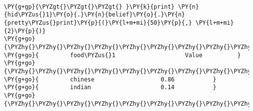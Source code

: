 \begin{example}
\caption{Vypočtené hodnoty skrytých proměnných}
\label{lst:epres}
\begin{Verbatim}[commandchars=\\\{\}]

\PY{g+gp}{\PYZgt{}\PYZgt{}\PYZgt{} }\PY{k}{print} \PY{n}{hid\PYZus{}1}\PY{o}{.}\PY{n}{belief}\PY{o}{.}\PY{n}{pretty\PYZus{}print}\PY{p}{(}\PY{l+m+mi}{50}\PY{p}{,} \PY{l+m+mi}{2}\PY{p}{)}
\PY{g+go}{\PYZhy{}\PYZhy{}\PYZhy{}\PYZhy{}\PYZhy{}\PYZhy{}\PYZhy{}\PYZhy{}\PYZhy{}\PYZhy{}\PYZhy{}\PYZhy{}\PYZhy{}\PYZhy{}\PYZhy{}\PYZhy{}\PYZhy{}\PYZhy{}\PYZhy{}\PYZhy{}\PYZhy{}\PYZhy{}\PYZhy{}\PYZhy{}\PYZhy{}\PYZhy{}\PYZhy{}\PYZhy{}\PYZhy{}\PYZhy{}\PYZhy{}\PYZhy{}\PYZhy{}\PYZhy{}\PYZhy{}\PYZhy{}\PYZhy{}\PYZhy{}\PYZhy{}\PYZhy{}\PYZhy{}\PYZhy{}\PYZhy{}\PYZhy{}\PYZhy{}\PYZhy{}\PYZhy{}\PYZhy{}\PYZhy{}\PYZhy{}}
\PY{g+go}{         food\PYZus{}1                    Value          }
\PY{g+go}{\PYZhy{}\PYZhy{}\PYZhy{}\PYZhy{}\PYZhy{}\PYZhy{}\PYZhy{}\PYZhy{}\PYZhy{}\PYZhy{}\PYZhy{}\PYZhy{}\PYZhy{}\PYZhy{}\PYZhy{}\PYZhy{}\PYZhy{}\PYZhy{}\PYZhy{}\PYZhy{}\PYZhy{}\PYZhy{}\PYZhy{}\PYZhy{}\PYZhy{}\PYZhy{}\PYZhy{}\PYZhy{}\PYZhy{}\PYZhy{}\PYZhy{}\PYZhy{}\PYZhy{}\PYZhy{}\PYZhy{}\PYZhy{}\PYZhy{}\PYZhy{}\PYZhy{}\PYZhy{}\PYZhy{}\PYZhy{}\PYZhy{}\PYZhy{}\PYZhy{}\PYZhy{}\PYZhy{}\PYZhy{}\PYZhy{}\PYZhy{}}
\PY{g+go}{         chinese                   0.86           }
\PY{g+go}{         indian                    0.14           }
\PY{g+go}{\PYZhy{}\PYZhy{}\PYZhy{}\PYZhy{}\PYZhy{}\PYZhy{}\PYZhy{}\PYZhy{}\PYZhy{}\PYZhy{}\PYZhy{}\PYZhy{}\PYZhy{}\PYZhy{}\PYZhy{}\PYZhy{}\PYZhy{}\PYZhy{}\PYZhy{}\PYZhy{}\PYZhy{}\PYZhy{}\PYZhy{}\PYZhy{}\PYZhy{}\PYZhy{}\PYZhy{}\PYZhy{}\PYZhy{}\PYZhy{}\PYZhy{}\PYZhy{}\PYZhy{}\PYZhy{}\PYZhy{}\PYZhy{}\PYZhy{}\PYZhy{}\PYZhy{}\PYZhy{}\PYZhy{}\PYZhy{}\PYZhy{}\PYZhy{}\PYZhy{}\PYZhy{}\PYZhy{}\PYZhy{}\PYZhy{}\PYZhy{}}


\end{Verbatim}
\end{example}
